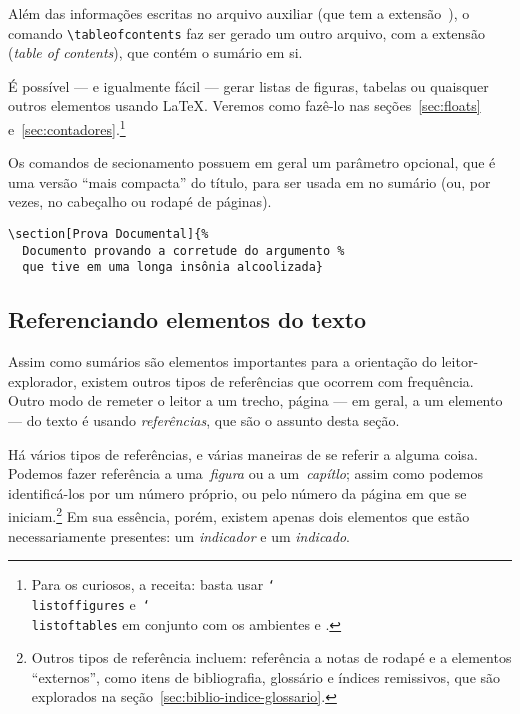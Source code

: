 Além das informações escritas no arquivo auxiliar (que tem a
extensão~), o comando \verb'\tableofcontents' faz ser
gerado um outro arquivo, com a extensão  (\emph{table of
  contents}), que contém o sumário em si. 

É possível --- e igualmente fácil --- gerar listas de figuras, tabelas
ou quaisquer outros elementos usando \LaTeX. Veremos como fazê-lo nas
seções~\ref{sec:floats} e~\ref{sec:contadores}.\footnote{Para os
  curiosos, a receita: basta usar  \texttt{\char`\\{}listoffigures}
  e~\texttt{\char`\\{}listoftables} em conjunto com os ambientes
   e .}


Os comandos de secionamento possuem em geral um parâmetro opcional,
que é uma versão ``mais compacta'' do título, para ser usada em no
sumário (ou, por vezes, no cabeçalho ou rodapé de páginas).
\begin{footnotesize}
\begin{verbatim}
\section[Prova Documental]{%
  Documento provando a corretude do argumento %
  que tive em uma longa insônia alcoolizada}
\end{verbatim}
\end{footnotesize}


\subsection{Referenciando elementos do texto}

Assim como sumários são elementos importantes para a orientação do leitor-explorador, existem outros tipos de referências que ocorrem com frequência. Outro modo de remeter o leitor a um trecho, página --- em geral, a um elemento --- do texto é usando \emph{referências}, que são o assunto desta seção.

Há vários tipos de referências, e várias maneiras de se referir a alguma coisa. Podemos fazer referência a uma~\emph{figura} ou a um~\emph{capítlo}; assim como podemos identificá-los por um número próprio, ou pelo número da página em que se iniciam.\footnote{Outros tipos de referência incluem: referência a notas de rodapé e a elementos ``externos'', como itens de bibliografia, glossário e índices remissivos, que são explorados na seção~\ref{sec:biblio-indice-glossario}.} Em sua essência, porém, existem apenas dois elementos que estão necessariamente presentes: um \emph{indicador} e um \emph{indicado}.

